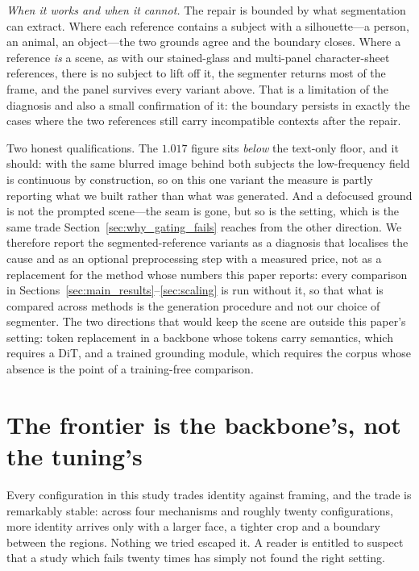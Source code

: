 \documentclass[review,10pt,times]{elsarticle}
\begin{document}
\noindent\textit{When it works and when it cannot.}
The repair is bounded by what segmentation can extract.  Where each reference
contains a subject with a silhouette---a person, an animal, an object---the
two grounds agree and the boundary closes.  Where a reference \emph{is} a
scene, as with our stained-glass and multi-panel character-sheet references,
there is no subject to lift off it, the segmenter returns most of the frame,
and the panel survives every variant above.  That is a limitation of the
diagnosis and also a small confirmation of it: the boundary persists in
exactly the cases where the two references still carry incompatible contexts
after the repair.

Two honest qualifications.  The $1.017$ figure sits \emph{below} the
text-only floor, and it should: with the same blurred image behind both
subjects the low-frequency field is continuous by construction, so on this
one variant the measure is partly reporting what we built rather than what
was generated.  And a defocused ground is not the prompted scene---the seam
is gone, but so is the setting, which is the same trade
Section~\ref{sec:why_gating_fails} reaches from the other direction.  We
therefore report the segmented-reference variants as a diagnosis that
localises the cause and as an optional preprocessing step with a measured
price, not as a replacement for the method whose numbers this paper reports:
every comparison in Sections~\ref{sec:main_results}--\ref{sec:scaling} is run
without it, so that what is compared across methods is the generation
procedure and not our choice of segmenter.  The
two directions that would keep the scene are outside this paper's setting:
token replacement in a backbone whose tokens carry semantics, which requires
a DiT, and a trained grounding module, which requires the corpus whose
absence is the point of a training-free comparison.

\section{The frontier is the backbone's, not the tuning's}
\label{sec:architecture}

Every configuration in this study trades identity against framing, and the
trade is remarkably stable: across four mechanisms and roughly twenty
configurations, more identity arrives only with a larger face, a tighter crop
and a boundary between the regions.  Nothing we tried escaped it.  A reader is
entitled to suspect that a study which fails twenty times has simply not found
the right setting.
\end{document}
